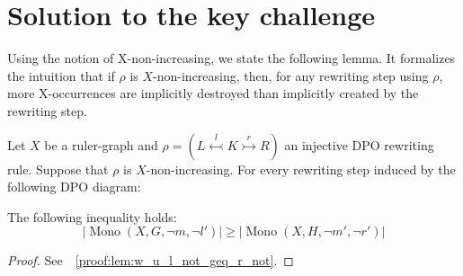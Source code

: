 \section{Solution to the key challenge}
\label{subgraph_counting:sec:solution_to_the_key_challenge}
Using the notion of X-non-increasing, we state the following lemma.
 It formalizes the intuition that if $\rho$ is $X$-non-increasing, then, for any rewriting step using $\rho$, 
more X-occurrences are implicitly destroyed than implicitly created by the rewriting step.
\begin{lemma} 
    \label{subgraph_counting:lem:w_u_l_not_geq_r_not}
        Let $X$ be a ruler-graph and $\rho \mathop{=} (L \overset{l}{\leftarrowtail} K \overset{r}{\rightarrowtail} R)$ an injective DPO rewriting rule.
        Suppose that $\rho$ is $X$-non-increasing. For every rewriting step induced by the following DPO diagram:
        \begin{center}
        \end{center}
       The following inequality holds:
        \[
            |\operatorname{Mono}(X, G, \lnot m, \lnot l')| \mathop{\geq} |\operatorname{Mono}(X, H, \lnot m', \lnot r')|
        \]
\end{lemma}
\begin{proof}
        See~\textsection~\ref{proof:lem:w_u_l_not_geq_r_not}.
\end{proof} 
